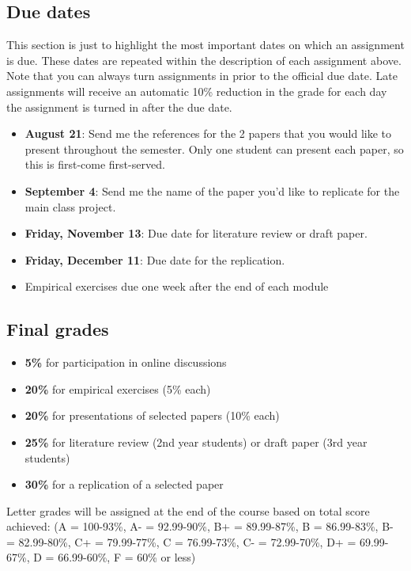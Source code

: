 \documentclass[11pt,]{article}
\providecommand{\tightlist}{%
  \setlength{\itemsep}{0pt}\setlength{\parskip}{0pt}}
\begin{document}
\hypertarget{due-dates}{%
\subsection{Due dates}\label{due-dates}}

This section is just to highlight the most important dates on which an
assignment is due. These dates are repeated within the description of
each assignment above. Note that you can always turn assignments in
prior to the official due date. Late assignments will receive an
automatic 10\% reduction in the grade for each day the assignment is
turned in after the due date.

\begin{itemize}
\tightlist
\item
  \textbf{August 21}: Send me the references for the 2 papers that you
  would like to present throughout the semester. Only one student can
  present each paper, so this is first-come first-served.
\item
  \textbf{September 4}: Send me the name of the paper you'd like to
  replicate for the main class project.
\item
  \textbf{Friday, November 13}: Due date for literature review or draft
  paper.
\item
  \textbf{Friday, December 11}: Due date for the replication.
\item
  Empirical exercises due one week after the end of each module
\end{itemize}

\hypertarget{final-grades}{%
\subsection{Final grades}\label{final-grades}}

\begin{itemize}
\item
  \textbf{5\%} for participation in online discussions
\item
  \textbf{20\%} for empirical exercises (5\% each)
\item
  \textbf{20\%} for presentations of selected papers (10\% each)
\item
  \textbf{25\%} for literature review (2nd year students) or draft paper
  (3rd year students)
\item
  \textbf{30\%} for a replication of a selected paper
\end{itemize}

Letter grades will be assigned at the end of the course based on total
score achieved: (A = 100-93\%, A- = 92.99-90\%, B+ = 89.99-87\%, B =
86.99-83\%, B- = 82.99-80\%, C+ = 79.99-77\%, C = 76.99-73\%, C- =
72.99-70\%, D+ = 69.99-67\%, D = 66.99-60\%, F = 60\% or less)
\end{document}
